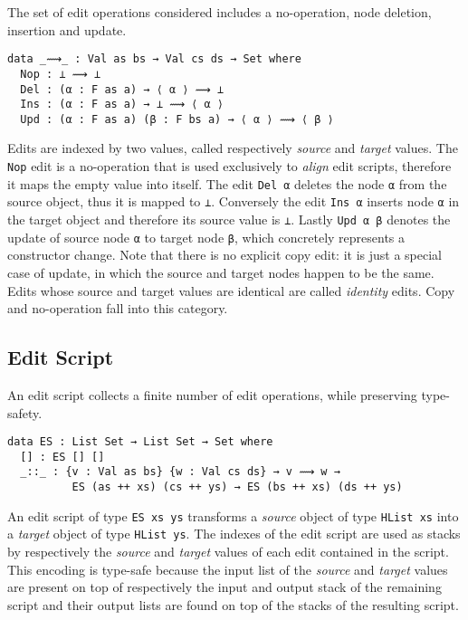 \documentclass[preprint]{sigplanconf}
\begin{document}
	The set of edit operations considered includes a no-operation, node 
	deletion, insertion and update.
\begin{verbatim}
data _⟿_ : Val as bs → Val cs ds → Set where
  Nop : ⊥ ⟿ ⊥
  Del : (α : F as a) → ⟨ α ⟩ ⟿ ⊥
  Ins : (α : F as a) → ⊥ ⟿ ⟨ α ⟩
  Upd : (α : F as a) (β : F bs a) → ⟨ α ⟩ ⟿ ⟨ β ⟩
\end{verbatim}
	Edits are indexed by two values, called respectively 
	\emph{source} and \emph{target} values. The \texttt{Nop} edit is 
	a no-operation that is used exclusively to \emph{align} edit scripts,
	therefore it maps the empty value into itself.
	The edit \texttt{Del α} deletes the node \texttt{α} from the source object, 
	thus it is mapped to \texttt{⊥}. Conversely the edit \texttt{Ins α} 
	inserts node \texttt{α} in the target object and therefore its source value 
	is 	\texttt{⊥}.
	Lastly \texttt{Upd α β} denotes the update of source node \texttt{α}
	to target node \texttt{β}, which concretely represents a 
	constructor change. 
	Note that there is no explicit copy edit: it is just a special case 
	of update, in which the source and target nodes happen to be the same.
	Edits whose source and target values are identical are 
	called \emph{identity} edits. Copy and no-operation fall into this
	category.
	
	\subsection{Edit Script}
        \label{subsec:edit-script}
	An edit script collects a finite number of edit operations, 
	while preserving type-safety. 
\begin{verbatim}
data ES : List Set → List Set → Set where
  [] : ES [] []
  _::_ : {v : Val as bs} {w : Val cs ds} → v ⟿ w → 
          ES (as ++ xs) (cs ++ ys) → ES (bs ++ xs) (ds ++ ys)
\end{verbatim}	
	An edit script of type \texttt{ES xs ys} transforms
	a \emph{source} object of type \texttt{HList xs} into
	a \emph{target} object of type \texttt{HList ys}. 
        The indexes of the edit script are used as stacks by respectively the 
        \emph{source} and \emph{target} values of each edit contained in the script.
        This encoding is type-safe because the input list of the \emph{source} and 
        \emph{target} values are present on top of respectively the input and output 
        stack of the remaining script and their output lists are 
        found on top of the stacks of the resulting script.
\end{document}
